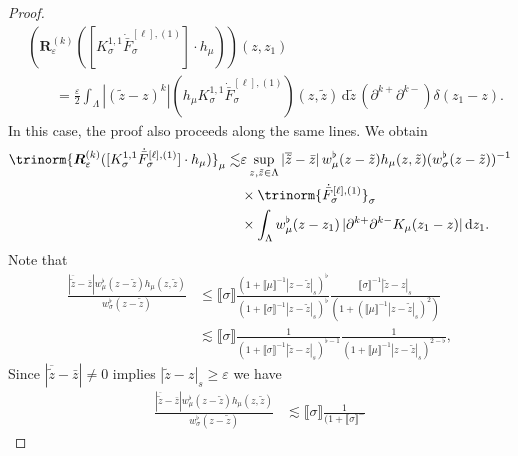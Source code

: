 \documentclass{article}
\numberwithin{equation}{section}
\newcommand{\mathd}{\mathrm{d}}
\theoremstyle{plain}
\theoremstyle{definition}
\begin{document}
\begin{proof}
  \begin{align*}
     &(\boldsymbol{R}_{\varepsilon}^{(k)} ([K^{1, 1}_{\sigma}
     \dot{\bar{F}}_{\sigma}^{[\ell], (1)}] \cdot h_{\mu})) (z, z_1)\\
     &\qquad = \frac{\varepsilon}{2} \int_{\Lambda}
     |(\tilde{z} - z)^k|
     (h_{\mu} K^{1, 1}_{\sigma}
     \dot{\bar{F}}_{\sigma}^{[\ell], (1)}) (z, \tilde{z})\,\mathd \tilde{z}\,     (\partial^{k+}  \partial^{k-}) \delta (z_1 - z) .
  \end{align*}
  In this case, the proof also proceeds along the same lines. We obtain
 \begin{align*}
       \trinorm{ \boldsymbol{R}_{\varepsilon}^{(k)} ([K^{1, 1}_{\sigma}
       \dot{\bar{F}}_{\sigma}^{[\ell], (1)}] \cdot h_{\mu}) }_{\mu}
       \lesssim & \varepsilon \sup_{z, \tilde{z} \in \Lambda} |
       \overline{\tilde{z}} - \bar{z} |\, w_{\mu}^\flat (z - \tilde{z}) h_{\mu} (z,
       \tilde{z})  (w_{\sigma}^{\flat} (z - \tilde{z}))^{- 1}\\
       &   \times \trinorm{ \dot{\bar{F}}_{\sigma}^{[\ell], (1)}
       }_{\sigma}\\
       &   \times \int_{\Lambda} w_{\mu}^{\flat} (z - z_1) \, |
       \partial^{k+}  \partial^{k-} K_{\mu} (z_1 - z) |\,\mathd z_1 .
   \end{align*}
  Note that
  \begin{align*}
       \frac{| \overline{\tilde{z}} - \bar{z} | w_{\mu}^{\flat} (z -
       \tilde{z}) h_{\mu} (z, \tilde{z})}{w_{\sigma}^{\flat} (z - \tilde{z})}
       & \leqslant  \llbracket \sigma \rrbracket \frac{(1 + \llbracket \mu
       \rrbracket^{- 1} | z - \tilde{z} |_s)^{\flat}}{(1 + \llbracket \sigma
       \rrbracket^{- 1} | z - \tilde{z} |_s)^{\flat}} \frac{\llbracket \sigma
       \rrbracket^{- 1} | \tilde{z} - z |_s}{{(1 + (\llbracket \mu
       \rrbracket^{- 1} | z - \tilde{z} |_s)^2) } }\\
       & \lesssim  \llbracket \sigma \rrbracket \frac{1}{(1 + \llbracket
       \sigma \rrbracket^{- 1} | \tilde{z} - z |_s)^{\flat - 1}} \frac{1}{{(1
       + \llbracket \mu \rrbracket^{- 1} | z - \tilde{z} |_s)^{2 - \flat}} },
   \end{align*}
  Since $| \overline{\tilde{z}} - \bar{z} | \neq 0$ implies $| \tilde{z} - z
  |_s \geqslant \varepsilon$ we have
  \begin{align*}
    \frac{| \overline{\tilde{z}} - \bar{z} | w_{\mu}^{\flat} (z - \tilde{z})
    h_{\mu} (z, \tilde{z})}{w_{\sigma}^{\flat} (z - \tilde{z})} &\lesssim 
    \llbracket \sigma \rrbracket \frac{1}{(1 + \llbracket \sigma \rrbracket^{-
}}
\end{align*}
\end{proof}
\end{document}
